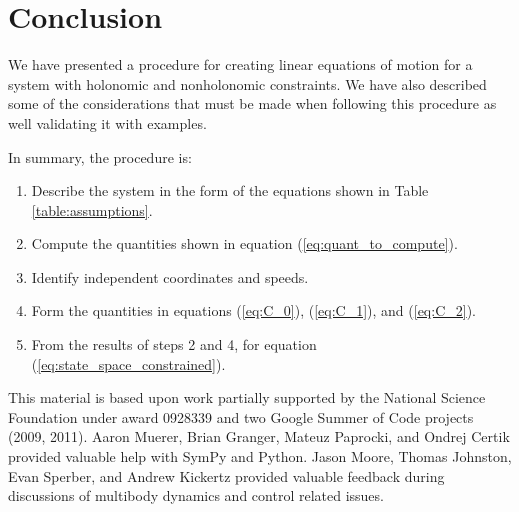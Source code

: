 \documentclass{svjour3}                     %
\begin{document}
\section{Conclusion}
We have presented a procedure for creating linear equations of
motion for a system with holonomic and nonholonomic constraints. We have also
described some of the considerations that must be made when following this
procedure as well validating it with examples.

In summary, the procedure is:
\begin{enumerate}
    \item Describe the system in the form of the equations shown in Table
        \ref{table:assumptions}.
    \item Compute the quantities shown in equation (\ref{eq:quant_to_compute}).
    \item Identify independent coordinates and speeds.
    \item Form the quantities in equations (\ref{eq:C_0}), (\ref{eq:C_1}), and
        (\ref{eq:C_2}).
    \item From the results of steps 2 and 4, for equation (\ref{eq:state_space_constrained}).
\end{enumerate}

\begin{acknowledgements}
  This material is based upon work partially supported by the National Science
  Foundation under award 0928339 and two Google Summer of Code projects (2009,
  2011).  Aaron Muerer, Brian Granger, Mateuz Paprocki, and Ondrej Certik
  provided valuable help with SymPy and Python.  Jason Moore, Thomas Johnston,
  Evan Sperber, and Andrew Kickertz provided valuable feedback during
  discussions of multibody dynamics and control related issues.
\end{acknowledgements}


\end{document}
